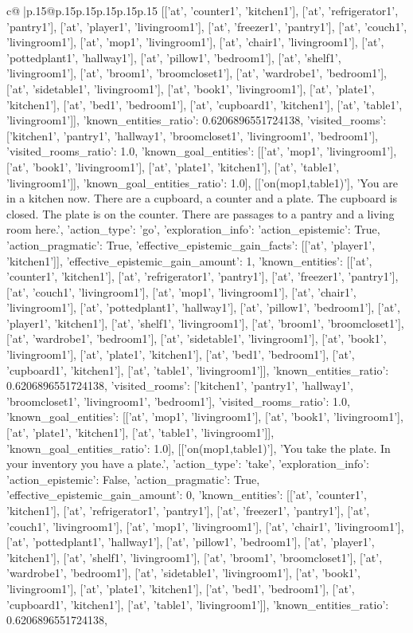 \documentclass{article}
\begin{document}
{\begin{supertabular}{c@{$\;$}|p{.15\linewidth}@{}p{.15\linewidth}p{.15\linewidth}p{.15\linewidth}p{.15\linewidth}p{.15\linewidth}}
{{{[['at', 'counter1', 'kitchen1'], ['at', 'refrigerator1', 'pantry1'], ['at', 'player1', 'livingroom1'], ['at', 'freezer1', 'pantry1'], ['at', 'couch1', 'livingroom1'], ['at', 'mop1', 'livingroom1'], ['at', 'chair1', 'livingroom1'], ['at', 'pottedplant1', 'hallway1'], ['at', 'pillow1', 'bedroom1'], ['at', 'shelf1', 'livingroom1'], ['at', 'broom1', 'broomcloset1'], ['at', 'wardrobe1', 'bedroom1'], ['at', 'sidetable1', 'livingroom1'], ['at', 'book1', 'livingroom1'], ['at', 'plate1', 'kitchen1'], ['at', 'bed1', 'bedroom1'], ['at', 'cupboard1', 'kitchen1'], ['at', 'table1', 'livingroom1']], 'known_entities_ratio': 0.6206896551724138, 'visited_rooms': ['kitchen1', 'pantry1', 'hallway1', 'broomcloset1', 'livingroom1', 'bedroom1'], 'visited_rooms_ratio': 1.0, 'known_goal_entities': [['at', 'mop1', 'livingroom1'], ['at', 'book1', 'livingroom1'], ['at', 'plate1', 'kitchen1'], ['at', 'table1', 'livingroom1']], 'known_goal_entities_ratio': 1.0}}], [['on(mop1,table1)'], 'You are in a kitchen now. There are a cupboard, a counter and a plate. The cupboard is closed. The plate is on the counter. There are passages to a pantry and a living room here.', {'action_type': 'go', 'exploration_info': {'action_epistemic': True, 'action_pragmatic': True, 'effective_epistemic_gain_facts': [['at', 'player1', 'kitchen1']], 'effective_epistemic_gain_amount': 1, 'known_entities': [['at', 'counter1', 'kitchen1'], ['at', 'refrigerator1', 'pantry1'], ['at', 'freezer1', 'pantry1'], ['at', 'couch1', 'livingroom1'], ['at', 'mop1', 'livingroom1'], ['at', 'chair1', 'livingroom1'], ['at', 'pottedplant1', 'hallway1'], ['at', 'pillow1', 'bedroom1'], ['at', 'player1', 'kitchen1'], ['at', 'shelf1', 'livingroom1'], ['at', 'broom1', 'broomcloset1'], ['at', 'wardrobe1', 'bedroom1'], ['at', 'sidetable1', 'livingroom1'], ['at', 'book1', 'livingroom1'], ['at', 'plate1', 'kitchen1'], ['at', 'bed1', 'bedroom1'], ['at', 'cupboard1', 'kitchen1'], ['at', 'table1', 'livingroom1']], 'known_entities_ratio': 0.6206896551724138, 'visited_rooms': ['kitchen1', 'pantry1', 'hallway1', 'broomcloset1', 'livingroom1', 'bedroom1'], 'visited_rooms_ratio': 1.0, 'known_goal_entities': [['at', 'mop1', 'livingroom1'], ['at', 'book1', 'livingroom1'], ['at', 'plate1', 'kitchen1'], ['at', 'table1', 'livingroom1']], 'known_goal_entities_ratio': 1.0}}], [['on(mop1,table1)'], 'You take the plate. In your inventory you have a plate.', {'action_type': 'take', 'exploration_info': {'action_epistemic': False, 'action_pragmatic': True, 'effective_epistemic_gain_amount': 0, 'known_entities': [['at', 'counter1', 'kitchen1'], ['at', 'refrigerator1', 'pantry1'], ['at', 'freezer1', 'pantry1'], ['at', 'couch1', 'livingroom1'], ['at', 'mop1', 'livingroom1'], ['at', 'chair1', 'livingroom1'], ['at', 'pottedplant1', 'hallway1'], ['at', 'pillow1', 'bedroom1'], ['at', 'player1', 'kitchen1'], ['at', 'shelf1', 'livingroom1'], ['at', 'broom1', 'broomcloset1'], ['at', 'wardrobe1', 'bedroom1'], ['at', 'sidetable1', 'livingroom1'], ['at', 'book1', 'livingroom1'], ['at', 'plate1', 'kitchen1'], ['at', 'bed1', 'bedroom1'], ['at', 'cupboard1', 'kitchen1'], ['at', 'table1', 'livingroom1']], 'known_entities_ratio': 0.6206896551724138, }}}
\end{supertabular}}
\end{document}
